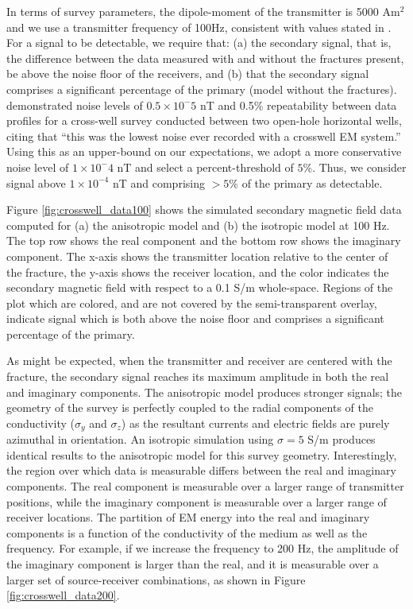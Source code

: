 In terms of survey parameters, the dipole-moment of the transmitter is 5000 Am$^2$ and we use a transmitter frequency of 100Hz, consistent with values stated in \cite{Wilt1995, Wilt2003}. For a signal to be detectable, we require that: (a) the secondary signal, that is, the difference between the data measured with and without the fractures present, be above the noise floor of the receivers, and (b) that the secondary signal comprises a significant percentage of the primary (model without the fractures). \cite{Marsala2015a} demonstrated noise levels of $0.5 \times 10^-5$ nT and 0.5\% repeatability between data profiles for a cross-well survey conducted between two open-hole horizontal wells, citing that ``this was the lowest noise ever recorded with a crosswell EM system.'' Using this as an upper-bound on our expectations, we adopt a more conservative noise level of $1\times10^-4$ nT and select a percent-threshold of $5\%$. Thus, we consider signal above $1\times10^{-4}$ nT and comprising $>5\%$ of the primary as detectable.

Figure \ref{fig:crosswell_data100} shows the simulated secondary magnetic field data computed for (a) the anisotropic model and (b) the isotropic model at 100 Hz. The top row shows the real component and the bottom row shows the imaginary component. The x-axis shows the transmitter location relative to the center of the fracture, the y-axis shows the receiver location, and the color indicates the secondary magnetic field with respect to a 0.1 S/m whole-space. Regions of the plot which are colored, and are not covered by the semi-transparent overlay, indicate signal which is both above the noise floor and comprises a significant percentage of the primary.




As might be expected, when the transmitter and receiver are centered with the fracture, the secondary signal reaches its maximum amplitude in both the real and imaginary components. The anisotropic model produces stronger signals; the geometry of the survey is perfectly coupled to the radial components of the conductivity ($\sigma_y$ and $\sigma_z$) as the resultant currents and electric fields are purely azimuthal in orientation. An isotropic simulation using $\sigma = 5$ S/m produces identical results to the anisotropic model for this survey geometry. Interestingly, the region over which data is measurable differs between the real and imaginary components. The real component is measurable over a larger range of transmitter positions, while the imaginary component is measurable over a larger range of receiver locations. The partition of EM energy into the real and imaginary components is a function of the conductivity of the medium as well as the frequency. For example, if we increase the frequency to 200 Hz, the amplitude of the imaginary component is larger than the real, and it is measurable over a larger set of source-receiver combinations, as shown in Figure \ref{fig:crosswell_data200}.

